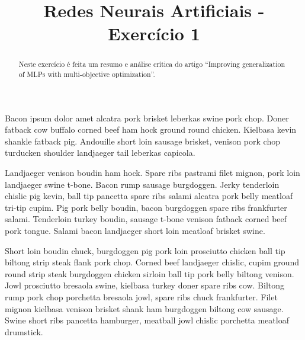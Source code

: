 \documentclass[conference]{IEEEtran}
\begin{document}
	
	\title{Redes Neurais Artificiais - Exercício 1}
	
	
	\author{
		}
	

	
	
	
	\maketitle
	
	\begin{abstract}
			
		Neste exercício é feita um resumo e análise crítica do artigo ``Improving generalization of MLPs with multi-objective	optimization''.
		
	\end{abstract}
	
	Bacon ipsum dolor amet alcatra pork brisket leberkas swine pork chop. Doner fatback cow buffalo corned beef ham hock ground round chicken. Kielbasa kevin shankle fatback pig. Andouille short loin sausage brisket, venison pork chop turducken shoulder landjaeger tail leberkas capicola.
	
	Landjaeger venison boudin ham hock. Spare ribs pastrami filet mignon, pork loin landjaeger swine t-bone. Bacon rump sausage burgdoggen. Jerky tenderloin chislic pig kevin, ball tip pancetta spare ribs salami alcatra pork belly meatloaf tri-tip cupim. Pig pork belly boudin, bacon burgdoggen spare ribs frankfurter salami. Tenderloin turkey boudin, sausage t-bone venison fatback corned beef pork tongue. Salami bacon landjaeger short loin meatloaf brisket swine.
	
	Short loin boudin chuck, burgdoggen pig pork loin prosciutto chicken ball tip biltong strip steak flank pork chop. Corned beef landjaeger chislic, cupim ground round strip steak burgdoggen chicken sirloin ball tip pork belly biltong venison. Jowl prosciutto bresaola swine, kielbasa turkey doner spare ribs cow. Biltong rump pork chop porchetta bresaola jowl, spare ribs chuck frankfurter. Filet mignon kielbasa venison brisket shank ham burgdoggen biltong cow sausage. Swine short ribs pancetta hamburger, meatball jowl chislic porchetta meatloaf drumstick.
	
\end{document}

